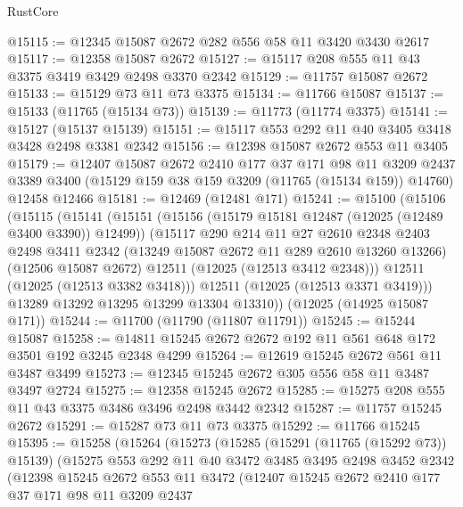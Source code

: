 \begin{lexlean}{RustCore}
\begin{coremodule}
@15115 := @12345 @15087 @2672 @282 @556 @58 @11 @3420 @3430 @2617
@15117 := @12358 @15087 @2672
@15127 := @15117 @208 @555 @11 @43 @3375 @3419 @3429 @2498 @3370 @2342
@15129 := @11757 @15087 @2672
@15133 := @15129 @73 @11 @73 @3375
@15134 := @11766 @15087
@15137 := @15133 (@11765 (@15134 @73))
@15139 := @11773 (@11774 @3375)
@15141 := @15127 (@15137 @15139)
@15151 := @15117 @553 @292 @11 @40 @3405 @3418 @3428 @2498 @3381 @2342
@15156 := @12398 @15087 @2672 @553 @11 @3405
@15179 := @12407
    @15087
    @2672
    @2410
    @177
    @37
    @171
    @98
    @11
    @3209
    @2437
    @3389
    @3400
    (@15129 @159 @38 @159 @3209 (@11765 (@15134 @159)) @14760)
    @12458
    @12466
@15181 := @12469 (@12481 @171)
@15241 := @15100
    (@15106
      (@15115
        (@15141
          (@15151
            (@15156 (@15179 @15181 @12487 (@12025 (@12489 @3400 @3390)) @12499))
            (@15117
              @290
              @214
              @11
              @27
              @2610
              @2348
              @2403
              @2498
              @3411
              @2342
              (@13249 @15087 @2672 @11 @289 @2610 @13260 @13266)
              (@12506 @15087 @2672)
              @12511
              (@12025 (@12513 @3412 @2348)))
            @12511
            (@12025 (@12513 @3382 @3418)))
          @12511
          (@12025 (@12513 @3371 @3419)))
        @13289
        @13292
        @13295
        @13299
        @13304
        @13310))
    (@12025 (@14925 @15087 @171))
@15244 := @11700 (@11790 (@11807 @11791))
@15245 := @15244 @15087
@15258 := @14811 @15245 @2672 @2672 @192 @11 @561 @648 @172 @3501 @192 @3245 @2348 @4299
@15264 := @12619 @15245 @2672 @561 @11 @3487 @3499
@15273 := @12345 @15245 @2672 @305 @556 @58 @11 @3487 @3497 @2724
@15275 := @12358 @15245 @2672
@15285 := @15275 @208 @555 @11 @43 @3375 @3486 @3496 @2498 @3442 @2342
@15287 := @11757 @15245 @2672
@15291 := @15287 @73 @11 @73 @3375
@15292 := @11766 @15245
@15395 := @15258
    (@15264
      (@15273
        (@15285
          (@15291 (@11765 (@15292 @73)) @15139)
          (@15275
            @553
            @292
            @11
            @40
            @3472
            @3485
            @3495
            @2498
            @3452
            @2342
            (@12398
              @15245
              @2672
              @553
              @11
              @3472
              (@12407
                @15245
                @2672
                @2410
                @177
                @37
                @171
                @98
                @11
                @3209
                @2437

\end{coremodule}
\end{lexlean}
